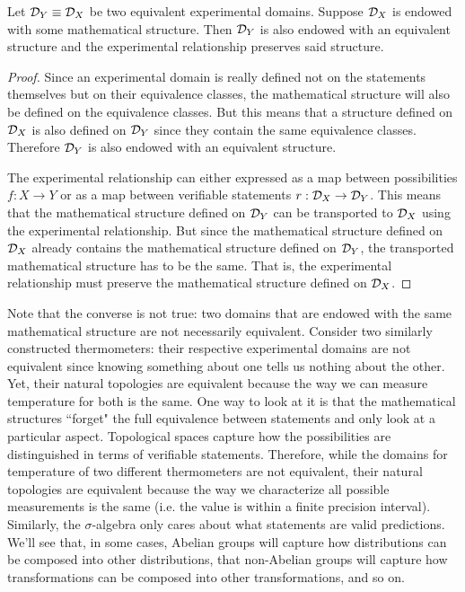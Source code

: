 \documentclass[11pt,letterpaper,fleqn]{memoir} %
\begin{document}
\begin{mathSection}
	\begin{thrm}\label{thrm_domain_equivalence_is_isomorphism}
		Let $\mathcal{D}_Y \equiv \mathcal{D}_X$ be two equivalent experimental domains. Suppose $\mathcal{D}_X$ is endowed with some mathematical structure. Then $\mathcal{D}_Y$ is also endowed with an equivalent structure and the experimental relationship preserves said structure.
	\end{thrm}
\begin{proof}
	Since an experimental domain is really defined not on the statements themselves but on their equivalence classes, the mathematical structure will also be defined on the equivalence classes. But this means that a structure defined on $\mathcal{D}_X$ is also defined on $\mathcal{D}_Y$ since they contain the same equivalence classes. Therefore $\mathcal{D}_Y$ is also endowed with an equivalent structure.
	
	The experimental relationship can either expressed as a map between possibilities $f : X \to Y$ or as a map between verifiable statements $r : \mathcal{D}_X \to \mathcal{D}_Y$. This means that the mathematical structure defined on $\mathcal{D}_Y$ can be transported to $\mathcal{D}_X$ using the experimental relationship. But since the mathematical structure defined on $\mathcal{D}_X$ already contains the mathematical structure defined on $\mathcal{D}_Y$, the transported mathematical structure has to be the same. That is, the experimental relationship must preserve the mathematical structure defined on $\mathcal{D}_X$.
\end{proof}
\end{mathSection}

Note that the converse is not true: two domains that are endowed with the same mathematical structure are not necessarily equivalent. Consider two similarly constructed thermometers: their respective experimental domains are not equivalent since knowing something about one tells us nothing about the other. Yet, their natural topologies are equivalent because the way we can measure temperature for both is the same. One way to look at it is that the mathematical structures ``forget" the full equivalence between statements and only look at a particular aspect. Topological spaces capture how the possibilities are distinguished in terms of verifiable statements. Therefore, while the domains for temperature of two different thermometers are not equivalent, their natural topologies are equivalent because the way we characterize all possible measurements is the same (i.e. the value is within a finite precision interval). Similarly, the $\sigma$-algebra only cares about what statements are valid predictions. We'll see that, in some cases, Abelian groups will capture how distributions can be composed into other distributions, that non-Abelian groups will capture how transformations can be composed into other transformations, and so on.
\end{document}
